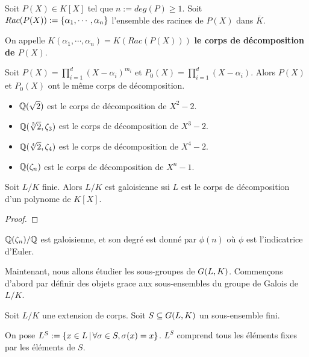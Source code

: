 \begin{definition}
	Soit $P(X) \in K[X]$ tel que $n := deg(P) \geq 1$. Soit $Rac(P(X)) :=
	\left\{ \alpha_{1}, \cdots, \alpha_{n} \right\}$ l'ensemble
	des racines de $P(X)$ dans $\overline{K}$.

	On appelle $K(\alpha_{1}, \cdots, \alpha_{n}) = K(Rac(P(X)))$ \textbf{le
	corps de décomposition de $P(X)$}.
\end{definition}

\begin{remarque}
	Soit $P(X) = \displaystyle \prod_{i = 1}^{d} (X - \alpha_{i})^{m_{i}}$ et
	$P_{0}(X) = \displaystyle \prod_{i = 1}^{d} (X - \alpha_{i})$. Alors $P(X)$
	et $P_{0}(X)$ ont le même corps de décomposition.
\end{remarque}

\begin{exemple}
	\begin{itemize}
		\item $\mathbb{Q}(\sqrt{2})$ est le corps de décomposition de $X^{2} -
			2$.
		\item $\mathbb{Q}(\sqrt[3]{2}, \zeta_{3})$ est le corps de décomposition
			de $X^{3} - 2$.
		\item $\mathbb{Q}(\sqrt[4]{2}, \zeta_{4})$ est le corps de décomposition
			de $X^{4} - 2$.
		\item $\mathbb{Q}(\zeta_{n})$ est le corps de décomposition de $X^{n} -
			1$.
	\end{itemize}
\end{exemple}

\begin{proposition}
	Soit $L/K$ finie. Alors $L/K$ est galoisienne ssi $L$ est le corps de
	décomposition d'un polynome de $K[X]$.
\end{proposition}

\ifdefined\outputproof
\begin{proof}

\end{proof}
\fi

\begin{exemple}
	$\mathbb{Q}(\zeta_{n})/\mathbb{Q}$ est galoisienne, et son degré est donné par
	$\phi(n)$ où $\phi$ est l'indicatrice d'Euler.
\end{exemple}

Maintenant, nous allons étudier les sous-groupes de $G(L, K)$.
Commençons d'abord par définir des objets grace aux sous-ensembles du groupe de
Galois de $L/K$.

\begin{definition}
	Soit $L/K$ une extension de corps.
	Soit $S \subseteq G(L, K)$ un sous-ensemble fini.

	On pose $L^{S} := \left\{x \in L \, | \, \forall \sigma \in S, \sigma(x) = x \right\}$.
	$L^{S}$ comprend tous les éléments fixes par les éléments de $S$.
\end{definition}

